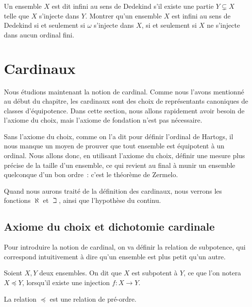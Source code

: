\begin{exercise}
  Un ensemble $X$ est dit infini au sens de Dedekind s'il existe une partie
  $Y\subsetneq X$ telle que $X$ s'injecte dans $Y$. Montrer qu'un ensemble $X$
  est infini au sens de Dedekind si et seulement si $\omega$ s'injecte dans $X$,
  si et seulement si $X$ ne s'injecte dans aucun ordinal fini.
\end{exercise}

\section{Cardinaux}

Nous étudions maintenant la notion de cardinal. Comme nous l'avons mentionné
au début du chapitre, les cardinaux sont des choix de représentants canoniques
de classes d'équipotence. Dans cette section, nous allons rapidement avoir
besoin de l'axiome du choix, mais l'axiome de fondation n'est pas nécessaire.

Sans l'axiome du choix, comme on l'a dit pour définir l'ordinal de Hartogs, il
nous manque un moyen de prouver que tout ensemble est équipotent à un ordinal.
Nous allons donc, en utilisant l'axiome du choix, définir une mesure plus
précise de la taille d'un ensemble, ce qui revient au final à munir un ensemble
quelconque d'un bon ordre~: c'est le théorème de Zermelo.

Quand nous aurons traité de la définition des cardinaux, nous verrons les
fonctions $\aleph$ et $\beth$, ainsi que l'hypothèse du continu.

\subsection{Axiome du choix et dichotomie cardinale}

Pour introduire la notion de cardinal, on va définir la relation de subpotence,
qui correspond intuitivement à dire qu'un ensemble est plus petit qu'un autre.

\begin{definition}[Subpotence]
  Soient $X,Y$ deux ensembles. On dit que $X$ est subpotent à $Y$, ce que l'on
  notera $X\preceq Y$, lorsqu'il existe une injection $f : X \to Y$.
\end{definition}

\begin{property}
  La relation $\preceq$ est une relation de pré-ordre.
\end{property}

